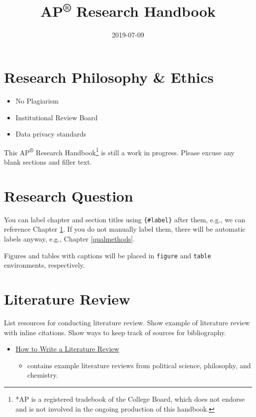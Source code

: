 \documentclass[]{book}
\title{AP\textsuperscript{®} Research Handbook}
\author{}
\date{2019-07-09}
\providecommand{\tightlist}{%
  \setlength{\itemsep}{0pt}\setlength{\parskip}{0pt}}
\let\rmarkdownfootnote\footnote%
\def\footnote{\protect\rmarkdownfootnote}
\begin{document}
\maketitle

{
\setcounter{tocdepth}{1}
\tableofcontents
}
\hypertarget{research-philosophy-ethics}{%
\chapter*{Research Philosophy \& Ethics}\label{research-philosophy-ethics}}

\begin{itemize}
\tightlist
\item
  No Plagiarism
\item
  Institutional Review Board
\item
  Data privacy standards
\end{itemize}

This AP\textsuperscript{®} Research Handbook\footnote{*AP is a registered tradebook of the College Board, which does not endorse and is not involved in the ongoing production of this handbook.} is still a work in progress. Please excuse any blank sections and filler text.

\hypertarget{intro}{%
\chapter{Research Question}\label{intro}}

You can label chapter and section titles using \texttt{\{\#label\}} after them, e.g., we can reference Chapter \ref{intro}. If you do not manually label them, there will be automatic labels anyway, e.g., Chapter \ref{qualmethods}.

Figures and tables with captions will be placed in \texttt{figure} and \texttt{table} environments, respectively.

\hypertarget{literature-review}{%
\chapter{Literature Review}\label{literature-review}}

List resources for conducting literature review.
Show example of literature review with inline citations.
Show ways to keep track of sources for bibliography.

\begin{itemize}
\tightlist
\item
  \href{https://writing.wisc.edu/handbook/assignments/reviewofliterature/}{How to Write a Literature Review}

  \begin{itemize}
  \tightlist
  \item
    contains example literature reviews from political science, philosophy, and chemistry.
  \end{itemize}
\end{itemize}
\end{document}
